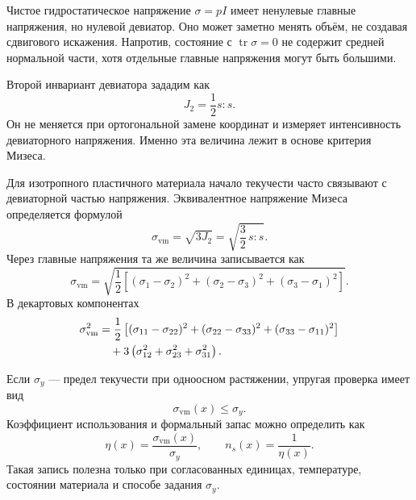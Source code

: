 Чистое гидростатическое напряжение $\sigma=pI$ имеет ненулевые главные напряжения, но нулевой девиатор. Оно может заметно менять объём, не создавая сдвигового искажения. Напротив, состояние с $\operatorname{tr}\sigma=0$ не содержит средней нормальной части, хотя отдельные главные напряжения могут быть большими.

Второй инвариант девиатора зададим как
\begin{equation}
\label{eq:j2-deviatoric-v05}
 J_2
 =\frac12 s:s.
\end{equation}
Он не меняется при ортогональной замене координат и измеряет интенсивность девиаторного напряжения. Именно эта величина лежит в основе критерия Мизеса.

Для изотропного пластичного материала начало текучести часто связывают с девиаторной частью напряжения. Эквивалентное напряжение Мизеса определяется формулой
\begin{equation}
\label{eq:von-mises-deviator-v05}
 \sigma_{\mathrm{vm}}
 =\sqrt{3J_2}
 =\sqrt{\frac32\,s:s}.
\end{equation}
Через главные напряжения та же величина записывается как
\begin{equation}
\label{eq:von-mises-principal-v05}
 \sigma_{\mathrm{vm}}
 =\sqrt{
 \frac12\left[
 (\sigma_1-\sigma_2)^2
 +(\sigma_2-\sigma_3)^2
 +(\sigma_3-\sigma_1)^2
 \right]
 }.
\end{equation}
В декартовых компонентах
\begin{align}
 \sigma_{\mathrm{vm}}^2
 &=\frac12\left[
 (\sigma_{11}-\sigma_{22})^2
 +(\sigma_{22}-\sigma_{33})^2
 +(\sigma_{33}-\sigma_{11})^2
 \right]
 \notag\\
 &\quad
 +3\left(\sigma_{12}^2+\sigma_{23}^2+\sigma_{31}^2\right).
 \label{eq:von-mises-components-v05}
\end{align}

Если $\sigma_y$ --- предел текучести при одноосном растяжении, упругая проверка имеет вид
\begin{equation}
\label{eq:von-mises-yield-check-v05}
 \sigma_{\mathrm{vm}}(x)\le \sigma_y.
\end{equation}
Коэффициент использования и формальный запас можно определить как
\begin{equation}
\label{eq:utilization-safety-v05}
 \eta(x)=\frac{\sigma_{\mathrm{vm}}(x)}{\sigma_y},
 \qquad
 n_s(x)=\frac1{\eta(x)}.
\end{equation}
Такая запись полезна только при согласованных единицах, температуре, состоянии материала и способе задания $\sigma_y$.

